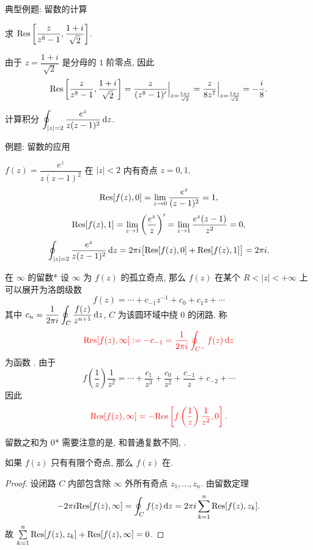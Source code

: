\begin{frame}{典型例题: 留数的计算}
\begin{example}
求 ${\mathrm{Res}}\left[\dfrac{z}{z^8-1},\dfrac{1+i}{\sqrt2}\right]$.
\end{example}
\begin{solution}
由于 $z=\dfrac{1+i}{\sqrt2}$ 是分母的 $1$ 阶零点,
\onslide<+->
因此
\[{\mathrm{Res}}\left[\frac z{z^8-1},\frac{1+i}{\sqrt2}\right]
=\frac z{(z^8-1)'}\Big|_{z=\frac{1+i}{\sqrt2}}
=\frac z{8z^7}\Big|_{z=\frac{1+i}{\sqrt2}}
=-\frac i8.\]
\vspace{-3pt}
\end{solution}
\begin{example}
计算积分 $\displaystyle\oint_{|z|=2}\frac{e^z}{z(z-1)^2}\,\mathrm{d} z$.
\end{example}
\end{frame}


\begin{frame}{例题: 留数的应用}
\begin{solution}
$f(z)=\dfrac{e^z}{z(z-1)^2}$ 在 $|z|<2$ 内有奇点 $z=0,1$.
\onslide<+->
\[{\mathrm{Res}}[f(z),0]=\lim_{z\to0}\frac{e^z}{(z-1)^2}=1,\]
\onslide<+->
\[{\mathrm{Res}}[f(z),1]=\lim_{z\to1}\left(\frac{e^z}z\right)'
=\lim_{z\to1}\frac{e^z(z-1)}{z^2}=0,\]
\onslide<+->
\[\oint_{|z|=2}\frac{e^z}{z(z-1)^2}\,\mathrm{d} z
=2\pi i\bigl[{\mathrm{Res}}[f(z),0]+{\mathrm{Res}}[f(z),1]\bigr]
=2\pi i.\]
\end{solution}
\end{frame}


\begin{frame}{在 $\infty$ 的留数*}
\onslide<+->
设 $\infty$ 为 $f(z)$ 的孤立奇点,
\onslide<+->
那么 $f(z)$ 在某个 $R<|z|<+\infty$ 上可以展开为洛朗级数
\[f(z)=\cdots+c_{-1}z^{-1}+c_0+c_1z+\cdots\]
\onslide<+->
其中 $c_n=\displaystyle\frac1{2\pi i}\oint_C\frac{f(z)}{z^{n+1}}\,\mathrm{d} z$, $C$ 为该圆环域中绕 $0$ 的闭路.
\onslide<+->
称
\[\markatt{\Res[f(z),\infty]:=-c_{-1}=\frac1{2\pi i}\oint_{C^-}f(z)\diff z}\]
为函数 .
\onslide<+->
由于
\[f\left(\frac1z\right)\frac1{z^2}=\cdots+\frac{c_1}{z^3}+\frac{c_0}{z^2}+\frac{c_{-1}}z+c_{-2}+\cdots\]
\onslide<+->
因此
\[\markatt{\Res[f(z),\infty]=-\Res\left[f\left(\frac1z\right)\frac1{z^2},0\right].}\]
\end{frame}


\begin{frame}{留数之和为 $0$*}
\onslide<+->
需要注意的是, 和普通复数不同, .

\begin{theorem}
如果 $f(z)$ 只有有限个奇点, 那么 $f(z)$ 在.
\end{theorem}
\begin{proof}
设闭路 $C$ 内部包含除 $\infty$ 外所有奇点 $z_1,\dots,z_n$.
\onslide<+->
由留数定理
\[-2\pi i{\mathrm{Res}}[f(z),\infty]=\oint_C f(z)\,\mathrm{d} z=2\pi i\sum_{k=1}^n{\mathrm{Res}}[f(z),z_k].\]
\onslide<+->
故 $\sum\limits_{k=1}^n{\mathrm{Res}}[f(z),z_k]+{\mathrm{Res}}[f(z),\infty]=0$.
\end{proof}
\end{frame}

